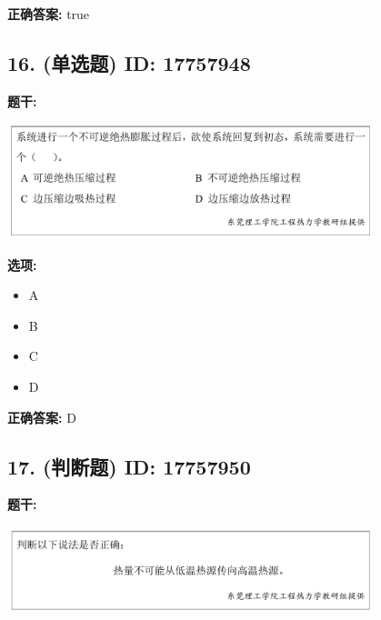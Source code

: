 \documentclass[12pt]{article}
\begin{document}
\textbf{正确答案:}
true

\vspace{0.5em}\hrulefill\vspace{1em}

\subsection*{16. (单选题) \small ID: 17757948}

\textbf{题干:}


\begin{center}\includegraphics[width=0.8\textwidth, height=0.25\textheight, keepaspectratio]{question_16_17757948/title_img_1.png}\end{center}

\textbf{选项:}
\begin{itemize}[leftmargin=*]
  \item A

  \item B

  \item C

  \item D

\end{itemize}

\textbf{正确答案:}
D

\vspace{0.5em}\hrulefill\vspace{1em}

\subsection*{17. (判断题) \small ID: 17757950}

\textbf{题干:}


\begin{center}\includegraphics[width=0.8\textwidth, height=0.25\textheight, keepaspectratio]{question_17_17757950/title_img_1.png}\end{center}
\end{document}

